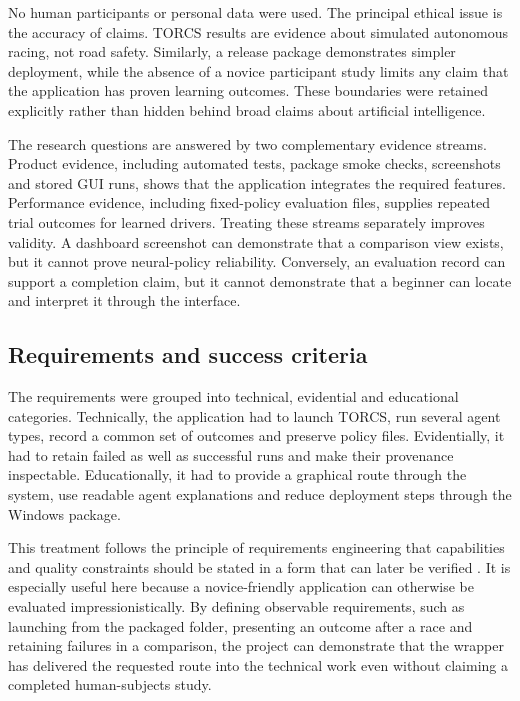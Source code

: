 No human participants or personal data were used. The principal ethical issue is the accuracy of claims. TORCS results are evidence about simulated autonomous racing, not road safety. Similarly, a release package demonstrates simpler deployment, while the absence of a novice participant study limits any claim that the application has proven learning outcomes. These boundaries were retained explicitly rather than hidden behind broad claims about artificial intelligence.

The research questions are answered by two complementary evidence streams. Product evidence, including automated tests, package smoke checks, screenshots and stored GUI runs, shows that the application integrates the required features. Performance evidence, including fixed-policy evaluation files, supplies repeated trial outcomes for learned drivers. Treating these streams separately improves validity. A dashboard screenshot can demonstrate that a comparison view exists, but it cannot prove neural-policy reliability. Conversely, an evaluation record can support a completion claim, but it cannot demonstrate that a beginner can locate and interpret it through the interface.

\subsection{Requirements and success criteria}

The requirements were grouped into technical, evidential and educational categories. Technically, the application had to launch TORCS, run several agent types, record a common set of outcomes and preserve policy files. Evidentially, it had to retain failed as well as successful runs and make their provenance inspectable. Educationally, it had to provide a graphical route through the system, use readable agent explanations and reduce deployment steps through the Windows package.

This treatment follows the principle of requirements engineering that capabilities and quality constraints should be stated in a form that can later be verified \parencite{iso29148}. It is especially useful here because a novice-friendly application can otherwise be evaluated impressionistically. By defining observable requirements, such as launching from the packaged folder, presenting an outcome after a race and retaining failures in a comparison, the project can demonstrate that the wrapper has delivered the requested route into the technical work even without claiming a completed human-subjects study.

